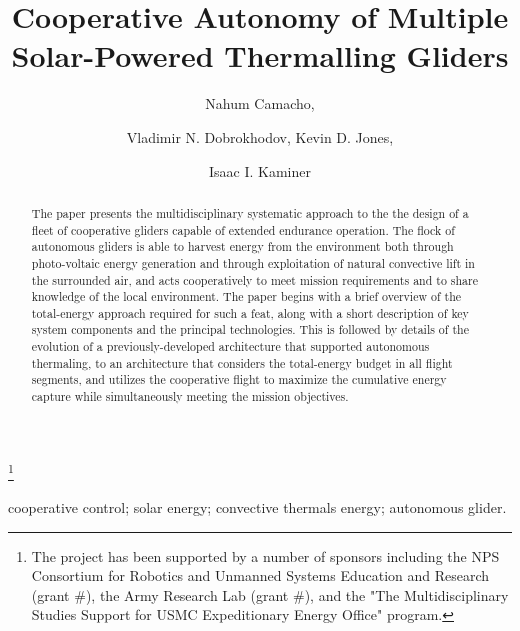 \documentclass{ifacconf}
\begin{document}
\begin{frontmatter}

\title{Cooperative Autonomy of Multiple Solar-Powered Thermalling Gliders }

\thanks[footnoteinfo]{The project has been supported by a number of sponsors including the NPS Consortium for Robotics and Unmanned Systems Education and Research (grant $\#$), the Army Research Lab (grant $\#$), and the "The Multidisciplinary Studies Support for USMC Expeditionary Energy Office" program.}

\author[First]{Nahum Camacho,}
\author[Second]{Vladimir N. Dobrokhodov, Kevin D. Jones,}
\author[Third]{Isaac I. Kaminer}

\address[First]{Graduate student at the Department  of Mechanical and Aerospace Engineering, Naval Postgraduate School, Monterey, CA 93943 USA ( e-mail: ncamacho@nps.edu)}
\address[Second]{Associate Professors at the Department  of Mechanical and Aerospace Engineering, Naval Postgraduate School, Monterey, CA 93943 USA (e-mail: {vndobrok,kdjones}@nps.edu}
\address[Third]{Professor at the Department  of Mechanical and Aerospace Engineering, Naval Postgraduate School, Monterey, CA 93943 USA (e-mail: kaminer@nps.edu)}


\begin{keyword}                           %
cooperative control; solar energy; convective thermals energy; autonomous glider.
\end{keyword}                             %


\begin{abstract}                          %
The paper presents the multidisciplinary systematic approach to the the design of a fleet of cooperative gliders capable of extended endurance operation. The flock of autonomous gliders is able to harvest energy from the environment both through photo-voltaic energy generation and through exploitation of natural convective lift in the surrounded air, and acts cooperatively to meet mission requirements and to share knowledge of the local environment. The paper begins with a brief overview of the total-energy approach required for such a feat, along with a short description of key system components and the principal technologies. This is followed by details of the evolution of a previously-developed architecture that supported autonomous thermaling, to an architecture that considers the total-energy budget in all flight segments, and utilizes the cooperative flight to maximize the  cumulative energy capture while simultaneously meeting the mission objectives.
\end{abstract}

\end{frontmatter}
\end{document}
